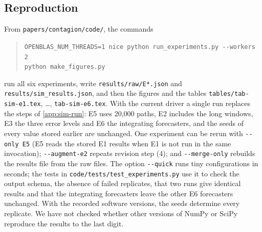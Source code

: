 \subsection{Reproduction}\label{app:sim-repro}

From \texttt{papers/contagion/code/}, the commands
\begin{quote}\small
\texttt{OPENBLAS\_NUM\_THREADS=1 nice python run\_experiments.py -{}-workers 2}\\
\texttt{python make\_figures.py}
\end{quote}
run all six experiments, write \texttt{results/raw/E*.json} and
\texttt{results/sim\_results.json}, and then the figures and the tables
\texttt{tables/tab-sim-e1.tex}, \dots, \texttt{tab-sim-e6.tex}. With the current driver a
single run replaces the steps of \cref{app:sim-run}: E5 uses 20{,}000 paths, E2 includes
the long windows, E3 the three error levels and E6 the integrating forecasters, and the
seeds of every value stored earlier are unchanged. One experiment can be rerun with
\texttt{-{}-only E5} (E5 reads the stored E1 results when E1 is not run in the same
invocation); \texttt{-{}-augment-e2} repeats revision step (4); and
\texttt{-{}-merge-only} rebuilds the results file from the raw files. The option
\texttt{-{}-quick} runs tiny configurations in seconds; the tests in
\texttt{code/tests/test\_experiments.py} use it to check the output schema, the absence of
failed replicates, that two runs give identical results and that the integrating
forecasters leave the other E6 forecasters unchanged. With the recorded software versions,
the seeds determine every replicate. We have not checked whether other versions of NumPy or
SciPy reproduce the results to the last digit.
